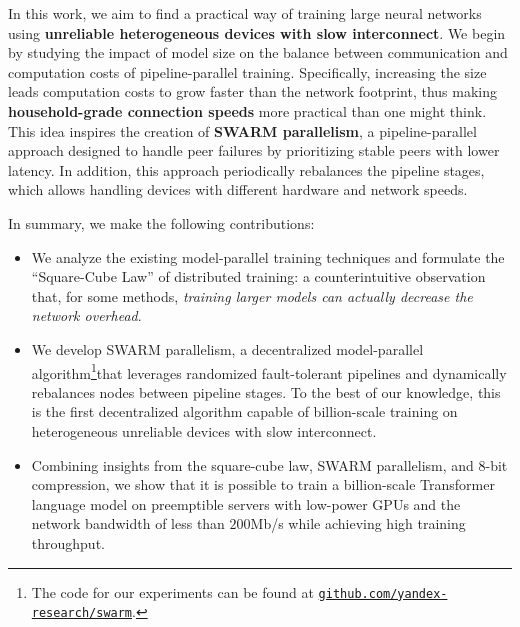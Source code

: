 In this work, we aim to find a practical way of training large neural networks using \textbf{unreliable heterogeneous devices with slow interconnect}.
We begin by studying the impact of model size on the balance between communication and computation costs of pipeline-parallel training.
Specifically, increasing the size leads computation costs to grow faster than the network footprint, thus making \textbf{household-grade connection speeds} more practical than one might think.
This idea inspires the creation of \textbf{SWARM parallelism}, a pipeline-parallel approach designed to handle peer failures by prioritizing stable peers with lower latency.
In addition, this approach periodically rebalances the pipeline stages, which allows handling devices with different hardware and network speeds.

In summary, we make the following contributions:
\vspace{-6pt}

\begin{itemize}
    \item We analyze the existing model-parallel training techniques and formulate the ``Square-Cube Law'' of distributed training: a counterintuitive observation that, for some methods, \textit{training larger models can actually decrease the network overhead}.
    \item We develop SWARM parallelism, a decentralized model-parallel algorithm\footnote{The code for our experiments can be found at \href{https://github.com/yandex-research/swarm}{\texttt{github.com/yandex-research/swarm}}.}that leverages randomized fault-tolerant pipelines and dynamically rebalances nodes between pipeline stages. To the best of our knowledge, this is the first decentralized algorithm capable of billion-scale training on heterogeneous unreliable devices with slow interconnect.
    \item Combining insights from the square-cube law, SWARM parallelism, and 8-bit compression, we show that it is possible to train a billion-scale Transformer language model on preemptible servers with low-power GPUs and the network bandwidth of less than $200$Mb/s while achieving high training throughput.
\end{itemize}







